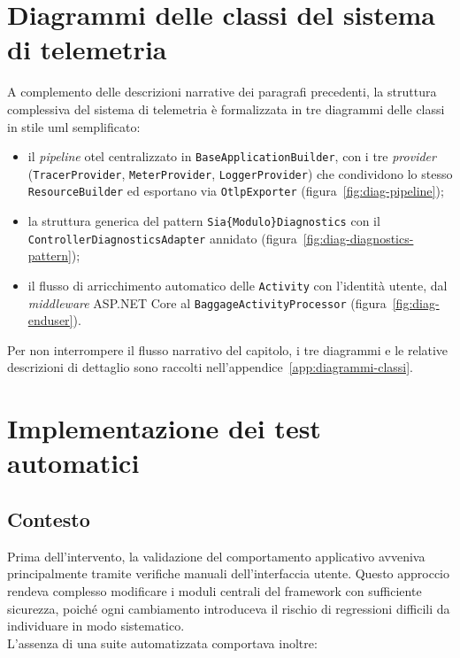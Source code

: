 \section{Diagrammi delle classi del sistema di telemetria}
\label{sec:class-diagrams}

A complemento delle descrizioni narrative dei paragrafi precedenti, la
struttura complessiva del sistema di telemetria è formalizzata in tre
diagrammi delle classi in stile \gls{uml} semplificato:

\begin{itemize}
      \item il \emph{pipeline} \gls{otel} centralizzato in
            \texttt{BaseApplicationBuilder}, con i tre \emph{provider}
            (\texttt{TracerProvider}, \texttt{MeterProvider},
            \texttt{LoggerProvider}) che condividono lo stesso
            \texttt{ResourceBuilder} ed esportano via
            \texttt{OtlpExporter} (figura~\ref{fig:diag-pipeline});
      \item la struttura generica del pattern
            \texttt{Sia\{Modulo\}Diagnostics} con il\\
            \texttt{ControllerDiagnosticsAdapter} annidato
            (figura~\ref{fig:diag-diagnostics-pattern});
      \item il flusso di arricchimento automatico delle \texttt{Activity}
            con l'identità utente, dal \emph{middleware} ASP.NET Core al
            \texttt{BaggageActivityProcessor} (figura~\ref{fig:diag-enduser}).
\end{itemize}
Per non interrompere il flusso narrativo del capitolo, i tre diagrammi e le
relative descrizioni di dettaglio sono raccolti nell'appendice~\ref{app:diagrammi-classi}.

\section{Implementazione dei test automatici}

\subsection{Contesto}

Prima dell’intervento, la validazione del comportamento applicativo avveniva
principalmente tramite verifiche manuali dell’interfaccia utente. Questo approccio
rendeva complesso modificare i moduli centrali del framework con sufficiente
sicurezza, poiché ogni cambiamento introduceva il rischio di regressioni difficili
da individuare in modo sistematico.\\
L’assenza di una suite automatizzata comportava inoltre:

